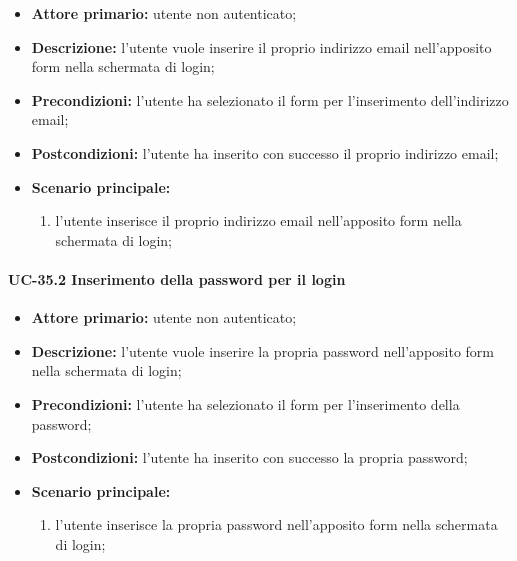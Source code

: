 	\begin{itemize}
		\item \textbf{Attore primario:} utente non autenticato;

		\item \textbf{Descrizione:} l'utente vuole inserire il proprio indirizzo email nell'apposito form nella schermata di login;

		\item \textbf{Precondizioni:} l'utente ha selezionato il form per l'inserimento dell'indirizzo email;

		\item \textbf{Postcondizioni:} l'utente ha inserito con successo il proprio indirizzo email;

		\item \textbf{Scenario principale:}
	  		\begin{enumerate}
		  		\item l'utente inserisce il proprio indirizzo email nell'apposito form nella schermata di login; 
	  		\end{enumerate}
	\end{itemize}

\paragraph{UC-35.2 Inserimento della password per il login}

	\begin{itemize}
		\item \textbf{Attore primario:} utente non autenticato;

		\item \textbf{Descrizione:} l'utente vuole inserire la propria password nell'apposito form nella schermata di login;

		\item \textbf{Precondizioni:} l'utente ha selezionato il form per l'inserimento della password;

		\item \textbf{Postcondizioni:} l'utente ha inserito con successo la propria password;

		\item \textbf{Scenario principale:}
	  		\begin{enumerate}
			  \item l'utente inserisce la propria password nell'apposito form nella schermata di login; 
	  		\end{enumerate}
	\end{itemize}

